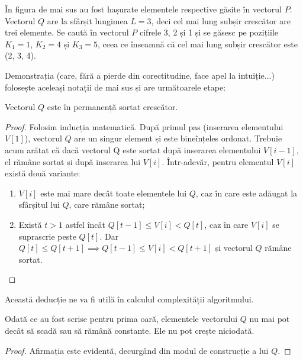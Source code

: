 În figura de mai sus au fost hașurate elementele respective găsite în vectorul
$P$. Vectorul $Q$ are la sfârșit lungimea $L=3$, deci cel mai lung subșir
crescător are trei elemente. Se caută în vectorul $P$ cifrele 3, 2 și 1 și se
găsesc pe pozițiile $K_1=1$, $K_2=4$ și $K_3=5$, ceea ce înseamnă că cel mai
lung subșir crescător este (2, 3, 4).

Demonstrația (care, fără a pierde din corectitudine, face apel la intuiție...)
folosește aceleași notații de mai sus și are următoarele etape:

\begin{proposition}
  Vectorul $Q$ este în permanență sortat crescător.
\end{proposition}

\begin{proof}
  Folosim inducția matematică. După primul pas (inserarea elementului $V[1]$),
  vectorul $Q$ are un singur element și este bineînțeles ordonat. Trebuie acum
  arătat că dacă vectorul Q este sortat după inserarea elementului $V[i-1]$,
  el rămâne sortat și după inserarea lui $V[i]$. Într-adevăr, pentru elementul
  $V[i]$ există două variante:

  \begin{enumerate}[label=\alph*)]

  \item $V[i]$ este mai mare decât toate elementele lui $Q$, caz în care este
    adăugat la sfârșitul lui $Q$, care rămâne sortat;

  \item Există $t>1$ astfel încât $Q[t-1] \leq V[i] <Q[t]$, caz în care $V[i]$
    se suprascrie peste $Q[t]$. Dar $Q[t] \leq Q[t+1] \implies Q[t-1] \leq
    V[i] < Q[t+1]$ și vectorul $Q$ rămâne sortat.

  \end{enumerate}
\end{proof}

Această deducție ne va fi utilă în calculul complexității algoritmului.

\begin{proposition}
  Odată ce au fost scrise pentru prima oară, elementele vectorului $Q$ nu mai
  pot decât să scadă sau să rămână constante. Ele nu pot crește niciodată.
\end{proposition}

\begin{proof}
  Afirmația este evidentă, decurgând din modul de construcție a lui $Q$.
\end{proof}

